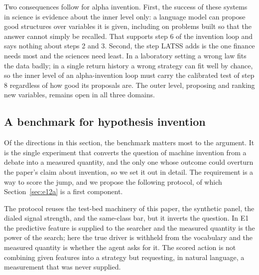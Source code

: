 \documentclass[11pt]{article}
\begin{document}
Two consequences follow for alpha invention. First, the success of these systems in science is evidence
about the inner level only: a language model can propose good structures over variables it is given,
including on problems built so that the answer cannot simply be recalled. That supports step 6 of the
invention loop and says nothing about steps 2 and 3. Second, the step LATSS adds is the one finance
needs most and the sciences need least. In a laboratory setting a wrong law fits the data badly; in a
single return history a wrong strategy can fit well by chance, so the inner level of an alpha-invention
loop must carry the calibrated test of step 8 regardless of how good its proposals are. The outer level,
proposing and ranking new variables, remains open in all three domains.

\subsection{A benchmark for hypothesis invention}
\label{sec:jumpbench}

Of the directions in this section, the benchmark matters most to the argument. It is the single
experiment that converts the question of machine invention from a debate into a measured quantity, and
the only one whose outcome could overturn the paper's claim about invention, so we set it out in detail. The
requirement is a way to score the jump, and we propose the following protocol, of which
Section~\ref{sec:e12a} is a first component.

The protocol reuses the test-bed machinery of this paper, the synthetic panel, the dialed signal
strength, and the same-class bar, but it inverts the question. In E1 the predictive feature is supplied
to the searcher and the measured quantity is the power of the search; here the true driver is withheld
from the vocabulary and the measured quantity is whether the agent asks for it. The scored action is
not combining given features into a strategy but requesting, in natural language, a measurement that
was never supplied.
\end{document}
